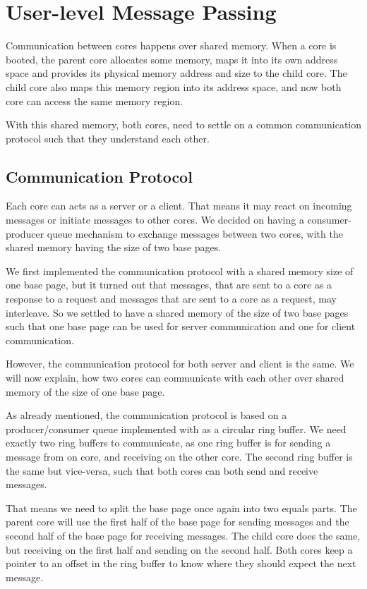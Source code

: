\chapter{User-level Message Passing}

Communication between cores happens over shared memory. When a core is booted,
the parent core allocates some memory, maps it into its own address space and
provides its physical memory address and size to the child core. The child core
also maps this memory region into its address space, and now both core can
access the same memory region.

With this shared memory, both cores, need to settle on a common communication
protocol such that they understand each other.

\section{Communication Protocol}

Each core can acts as a server or a client. That means it may react on incoming
messages or initiate messages to other cores.  We decided on having a
consumer-producer queue mechanism to exchange messages between two cores, with
the shared memory having the size of two base pages. 

We first implemented the communication protocol with a shared memory size of one
base page, but it turned out that messages, that are sent to a core as a
response to a request and messages that are sent to a core as a request, may
interleave. So we settled to have a shared memory of the size of two base pages
such that one base page can be used for server communication and one for client
communication. 

However, the communication protocol for both server and client is the same. We
will now explain, how two cores can communicate with each other over shared
memory of the size of one base page.

As already mentioned, the communication protocol is based on a producer/consumer
queue implemented with as a circular ring buffer. We need exactly two ring
buffers to communicate, as one ring buffer is for sending a message from on
core, and receiving on the other core. The second ring buffer is the same but
vice-versa, such that both cores can both send and receive messages. 

That means we need to split the base page once again into two equals parts. The
parent core will use the first half of the base page for sending messages and
the second half of the base page for receiving messages. The child core does the
same, but receiving on the first half and sending on the second half. Both cores
keep a pointer to an offset in the ring buffer to know where they should expect
the next message.

